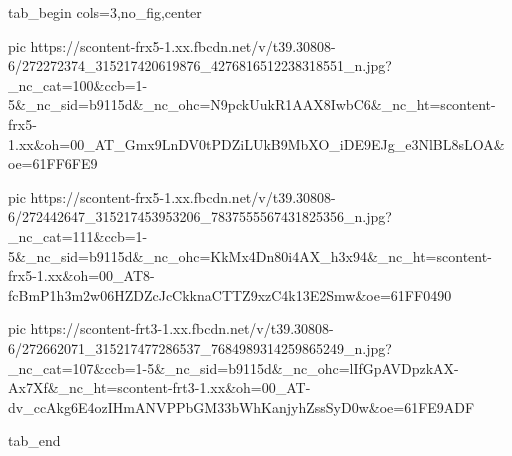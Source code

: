  
 
 
 
 


\ifcmt
  tab_begin cols=3,no_fig,center

     pic https://scontent-frx5-1.xx.fbcdn.net/v/t39.30808-6/272272374_315217420619876_4276816512238318551_n.jpg?_nc_cat=100&ccb=1-5&_nc_sid=b9115d&_nc_ohc=N9pckUukR1AAX8IwbC6&_nc_ht=scontent-frx5-1.xx&oh=00_AT_Gmx9LnDV0tPDZiLUkB9MbXO_iDE9EJg_e3NlBL8sLOA&oe=61FF6FE9

     pic https://scontent-frx5-1.xx.fbcdn.net/v/t39.30808-6/272442647_315217453953206_7837555567431825356_n.jpg?_nc_cat=111&ccb=1-5&_nc_sid=b9115d&_nc_ohc=KkMx4Dn80i4AX_h3x94&_nc_ht=scontent-frx5-1.xx&oh=00_AT8-fcBmP1h3m2w06HZDZcJcCkknaCTTZ9xzC4k13E2Smw&oe=61FF0490

     pic https://scontent-frt3-1.xx.fbcdn.net/v/t39.30808-6/272662071_315217477286537_7684989314259865249_n.jpg?_nc_cat=107&ccb=1-5&_nc_sid=b9115d&_nc_ohc=lIfGpAVDpzkAX-Ax7Xf&_nc_ht=scontent-frt3-1.xx&oh=00_AT-dv_ccAkg6E4ozIHmANVPPbGM33bWhKanjyhZssSyD0w&oe=61FE9ADF

  tab_end
\fi
